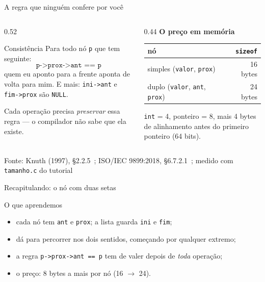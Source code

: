 \documentclass[aspectratio=169]{beamer}
\newcommand{\fonte}[1]{\vfill\hfill{\scriptsize\textcolor{UFSGray}{Fonte: #1}}}
\begin{document}
\begin{frame}{A regra que ninguém confere por você}
  \begin{columns}[T]
    \begin{column}{0.52\textwidth}
      \begin{block}{Consistência}
        \small Para todo nó \texttt{p} que tem seguinte:
        \[ \texttt{p->prox->ant == p} \]
        quem eu aponto para a frente aponta de volta para mim. E mais:
        \texttt{ini->ant} e \texttt{fim->prox} são \texttt{NULL}.
      \end{block}
      \small Cada operação precisa \emph{preservar} essa regra --- o
      compilador não sabe que ela existe.
    \end{column}
    \begin{column}{0.44\textwidth}
      \small
      \textbf{O preço em memória}\\[0.3em]
      \begin{tabular}{@{}lr@{}}
        \toprule
        nó & \texttt{sizeof}\\
        \midrule
        simples (\texttt{valor}, \texttt{prox}) & 16 bytes\\
        duplo (\texttt{valor}, \texttt{ant}, \texttt{prox}) & 24 bytes\\
        \bottomrule
      \end{tabular}

      \medskip
      \scriptsize \texttt{int} = 4, ponteiro = 8, mais 4 bytes de
      alinhamento antes do primeiro ponteiro (64 bits).
    \end{column}
  \end{columns}
  \fonte{Knuth (1997), §2.2.5~\cite{knuth1997art};
    ISO/IEC 9899:2018, §6.7.2.1~\cite{iso2018c17}; medido com \texttt{tamanho.c} do tutorial}
\end{frame}

\begin{frame}{Recapitulando: o nó com duas setas}
  \begin{block}{O que aprendemos}
    \begin{itemize}
      \item cada nó tem \texttt{ant} e \texttt{prox}; a lista guarda
        \texttt{ini} e \texttt{fim};
      \item dá para percorrer nos dois sentidos, começando por qualquer
        extremo;
      \item a regra \texttt{p->prox->ant == p} tem de valer depois de
        \emph{toda} operação;
      \item o preço: 8 bytes a mais por nó (16 $\to$ 24).
    \end{itemize}
  \end{block}
\end{frame}
\end{document}

